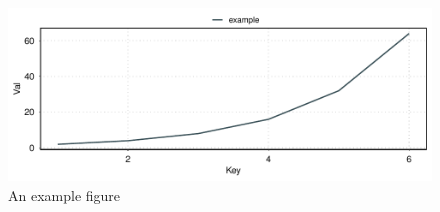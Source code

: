 \begin{figure}[h]
    \centering
        \centering
        \includegraphics[width=\linewidth]{figure/plot/example.tikz.pdf}
    \caption{An example figure}
    \label{fig:example}
\end{figure}
